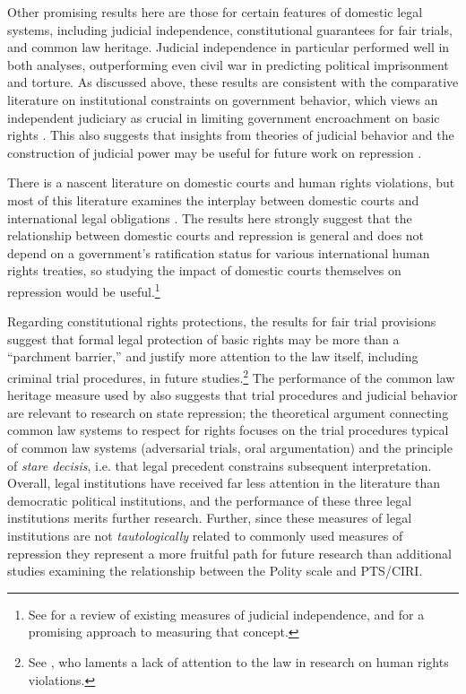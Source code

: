 \documentclass[11pt]{article}
\begin{document}
Other promising results here are those for certain features of domestic legal systems, including judicial independence, constitutional guarantees for fair trials, and common law heritage. Judicial independence in particular performed well in both analyses, outperforming even civil war in predicting political imprisonment and torture. As discussed above, these results are consistent with the comparative literature on institutional constraints on government behavior, which views an independent judiciary as crucial in limiting government encroachment on basic rights \citep[See esp.][]{NorthWeingast1989,Weingast1997,Vanberg2005}. This also suggests that insights from theories of judicial behavior and the construction of judicial power may be useful for future work on repression \citep[See][]{Vanberg2005,Staton2006,Carrubba2009,StatonMoore2011}. 

There is a nascent literature on domestic courts and human rights violations, but most of this literature examines the interplay between domestic courts and international legal obligations \citep{Hathaway2007,PowellStaton2009,Simmons2009,Conrad2012,ConradRitter2013}. The results here strongly suggest that the relationship between domestic courts and repression is general and does not depend on a government's ratification status for various international human rights treaties, so studying the impact of domestic courts themselves on repression would be useful.\footnote{See \citet{RiosStaton2012} for a review of existing measures of judicial independence, and \citet{LinzerStaton2011} for a promising approach to measuring that concept.} 

Regarding constitutional rights protections, the results for fair trial provisions suggest that formal legal protection of basic rights may be more than a ``parchment barrier,'' \citep[See][]{KeithTatePoe2009} and justify more attention to the law itself, including criminal trial procedures, in future studies.\footnote{See \citet{Cross1999}, who laments a lack of attention to the law in research on human rights violations.} The performance of the common law heritage measure used by \citet{Mitchell2013} also suggests that trial procedures and judicial behavior are relevant to research on state repression; the theoretical argument connecting common law systems to respect for rights focuses on the trial procedures typical of common law systems (adversarial trials, oral argumentation) and the principle of {\em stare decisis}, i.e. that legal precedent constrains subsequent interpretation. Overall, legal institutions have received far less attention in the literature than democratic political institutions, and the performance of these three legal institutions merits further research. Further, since these measures of legal institutions are not {\it tautologically} related to commonly used measures of repression they represent a more fruitful path for future research than additional studies examining the relationship between the Polity scale and PTS/CIRI. 
\end{document}
